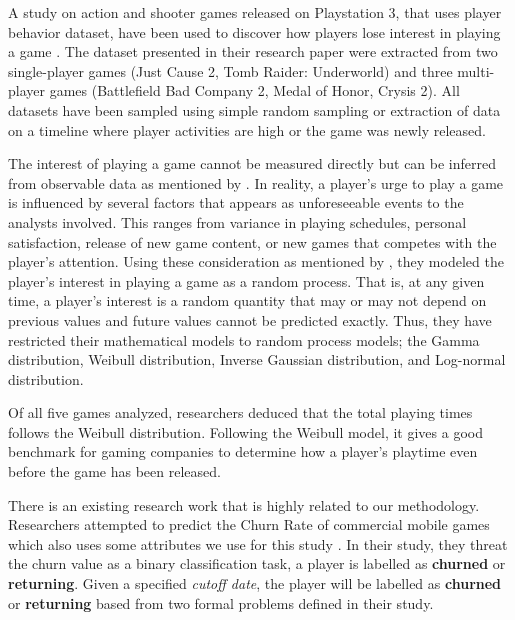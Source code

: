 A study on action and shooter games released on Playstation 3, that uses player behavior dataset, have been used to discover how players lose interest in playing a game \cite{ref:how_players_lose_interest}. The dataset presented in their research paper were extracted from two single-player games (Just Cause 2, Tomb Raider: Underworld) and three multi-player games (Battlefield Bad Company 2, Medal of Honor, Crysis 2).  All datasets have been sampled using simple random sampling or extraction of data on a timeline where player activities are high or the game was newly released.

The interest of playing a game cannot be measured directly but can be inferred from observable data as mentioned by \cite{ref:how_players_lose_interest}. In reality, a player's urge to play a game is influenced by several factors that appears as unforeseeable events to the analysts involved. This ranges from variance in playing schedules, personal satisfaction, release of new game content, or new games that competes with the player's attention. Using these consideration as mentioned by \cite{ref:how_players_lose_interest}, they modeled the player's interest in playing a game as a random process. That is, at any given time, a player's interest is a random quantity that may or may not depend on previous values and future values cannot be predicted exactly. Thus, they have restricted their mathematical models to random process models; the Gamma distribution, Weibull distribution, Inverse Gaussian distribution, and Log-normal distribution.

Of all five games analyzed, researchers deduced that the total playing times follows the Weibull distribution. Following the Weibull model, it gives a good benchmark for gaming companies to determine how a player's playtime even before the game has been released.

There is an existing research work that is highly related to our methodology. Researchers attempted to predict the Churn Rate of commercial mobile games which also uses some attributes we use for this study \cite{ref:predicting_player_churn}. In their study, they threat the churn value as a binary classification task, a player is labelled as \textbf{churned} or \textbf{returning}. Given a specified \textit{cutoff date}, the player will be labelled as \textbf{churned} or \textbf{returning} based from two formal problems defined in their study.